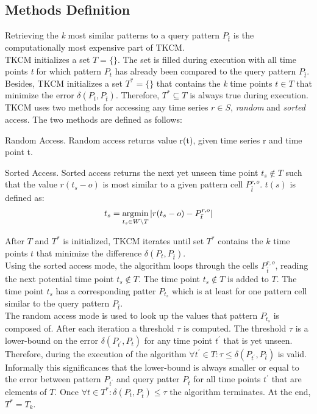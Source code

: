 \documentclass[abstracton,12pt]{scrreprt}
\begin{document}
\subsection{Methods Definition}
Retrieving the \emph{k} most similar patterns to a query pattern $P_{\bar{t}}$ is the computationally most expensive part of TKCM. \\
TKCM initializes a set $T =\{\}$. The set is filled during execution with all time points \emph{t} for which pattern $P_t$ has already been compared to the query pattern $P_{\bar{t}}$. Besides, TKCM initializes a set $T^*=\{\}$ that contains the \emph{k} time points $t \in T$ that minimize the error $\delta(P_{t}, P_{\bar{t}})$. Therefore, $T^* \subseteq T$ is always true during execution. 
\\TKCM uses two methods for accessing any time series $r \in S$, \emph{random} and \emph{sorted} access. The two methods are defined as follows: 
\begin{defn}
	Random Access. Random access returns value r(t), given time series r and time point t.	
\end{defn}
\begin{defn}
Sorted Access. Sorted access returns the next yet unseen time point $t_s \notin T$ such that the value $r(t_s-o)$ is most similar to a given pattern cell $P_{\bar{t}}^{r,o}$. $t(s)$ is defined as:
\begin{align*}
t_s = \argmin_{t_s \in W \setminus T} |r(t_s-o) - P_{\bar{t}}^{r,o}|
\end{align*}
\end{defn}
After $T$ and $T^*$ is initialized, TKCM iterates until set $T^*$ contains the $k$ time points $t$ that minimize the difference  $\delta(P_{t}, P_{\bar{t}})$. \\Using the sorted access mode, the algorithm loops through the cells $P_{\bar{t}}^{r,o}$, reading the next potential time point $t_s \notin T$. The time point $t_s \notin T$ is added to $T$. The time point $t_s$ has a corresponding patter $P_{t_s}$ which is at least for one pattern cell similar to the query pattern $P_{\bar{t}}$. \\
The random access mode is used to look up the values that pattern $P_{t_s}$ is composed of. After each iteration a threshold $\tau$ is computed. The threshold $\tau$ is a lower-bound on the error $\delta (P_{t^{'}}, P_{\bar{t}})$ for any time point $t^{'}$ that is yet unseen. Therefore, during the execution of the algorithm
$\forall t^{'} \in T : \tau \leq \delta(P_{t^{'}}, P_{\bar{t}}) $ is valid. Informally this significances that the lower-bound is always smaller or equal to the error between pattern $P_{t^{'}}$ and query patter $P_{\bar{t}}$ for all time points $t^{'}$ that are elements of $T$. Once $\forall t \in T^* : \delta(P_{t}, P_{\bar{t}}) \leq \tau$ the algorithm terminates. At the end, $T^*=T_k$. 
\end{document}

